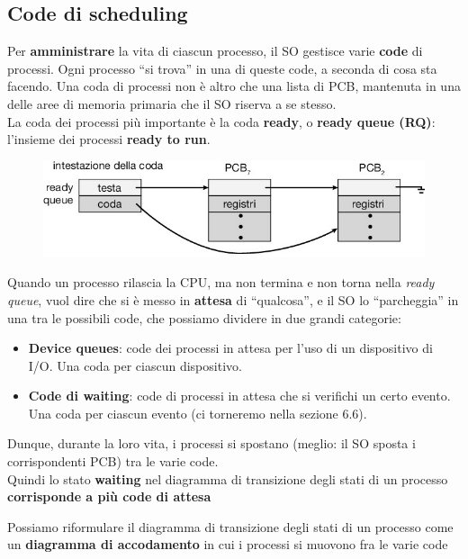 \subsection{Code di scheduling}
Per \textbf{amministrare} la vita di ciascun processo, il SO gestisce varie \textbf{code} di processi. Ogni processo “si trova” in una di queste code, a seconda di cosa sta facendo.
Una coda di processi non è altro che una lista di PCB, mantenuta in una delle aree di memoria primaria che il SO riserva a se stesso.\\
La coda dei processi più importante è la coda \textbf{ready}, o \textbf{ready queue (RQ)}: l'insieme dei processi \textbf{ready to run}.
\begin{figure}[h]
    \centering
    \includegraphics[width=0.5\linewidth]{images/ready_queue.png}
    \label{fig:ready_queue}
\end{figure}
Quando un processo rilascia la CPU, ma non termina e non torna nella \textit{ready queue}, vuol dire che si è messo in \textbf{attesa} di “qualcosa”, e il SO lo “parcheggia” in una tra le possibili code, che possiamo dividere in due grandi categorie:
\begin{itemize}
    \item \textbf{Device queues}: code dei processi in attesa per l’uso di un dispositivo di I/O. Una coda per ciascun dispositivo.
    \item \textbf{Code di waiting}: code di processi in attesa che si verifichi un certo evento. Una coda per ciascun evento (ci torneremo nella sezione 6.6).
\end{itemize}
Dunque, durante la loro vita, i processi si spostano (meglio: il SO sposta i corrispondenti PCB) tra le varie code.\\
Quindi lo stato \textbf{waiting} nel diagramma di transizione degli stati di un processo \textbf{corrisponde a più code di attesa}

Possiamo riformulare il diagramma di transizione degli stati di un processo come un \textbf{diagramma di accodamento} in cui i processi si muovono fra le varie code 

